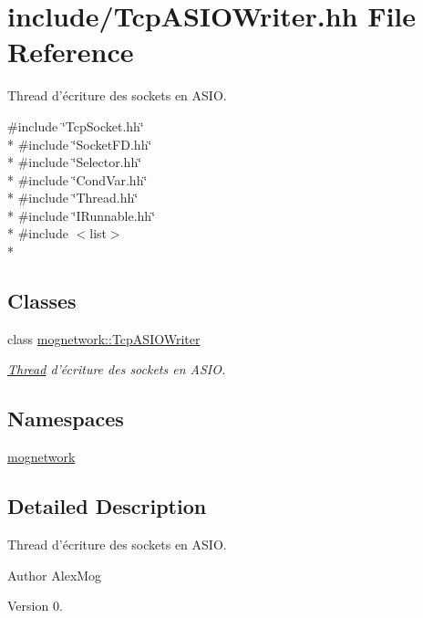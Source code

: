 \hypertarget{_tcp_a_s_i_o_writer_8hh}{\section{include/\-Tcp\-A\-S\-I\-O\-Writer.hh File Reference}
\label{_tcp_a_s_i_o_writer_8hh}
}


Thread d'écriture des sockets en A\-S\-I\-O.  


{\ttfamily \#include \char`\"{}Tcp\-Socket.\-hh\char`\"{}}\\*
{\ttfamily \#include \char`\"{}Socket\-F\-D.\-hh\char`\"{}}\\*
{\ttfamily \#include \char`\"{}Selector.\-hh\char`\"{}}\\*
{\ttfamily \#include \char`\"{}Cond\-Var.\-hh\char`\"{}}\\*
{\ttfamily \#include \char`\"{}Thread.\-hh\char`\"{}}\\*
{\ttfamily \#include \char`\"{}I\-Runnable.\-hh\char`\"{}}\\*
{\ttfamily \#include $<$list$>$}\\*
\subsection*{Classes}
\begin{DoxyCompactItemize}
\item 
class \hyperlink{classmognetwork_1_1_tcp_a_s_i_o_writer}{mognetwork\-::\-Tcp\-A\-S\-I\-O\-Writer}
\begin{DoxyCompactList}\small\item\em \hyperlink{classmognetwork_1_1_thread}{Thread} d'écriture des sockets en A\-S\-I\-O. \end{DoxyCompactList}\end{DoxyCompactItemize}
\subsection*{Namespaces}
\begin{DoxyCompactItemize}
\item 
\hyperlink{namespacemognetwork}{mognetwork}
\end{DoxyCompactItemize}


\subsection{Detailed Description}
Thread d'écriture des sockets en A\-S\-I\-O. \begin{DoxyAuthor}{Author}
Alex\-Mog 
\end{DoxyAuthor}
\begin{DoxyVersion}{Version}
0. 
\end{DoxyVersion}
